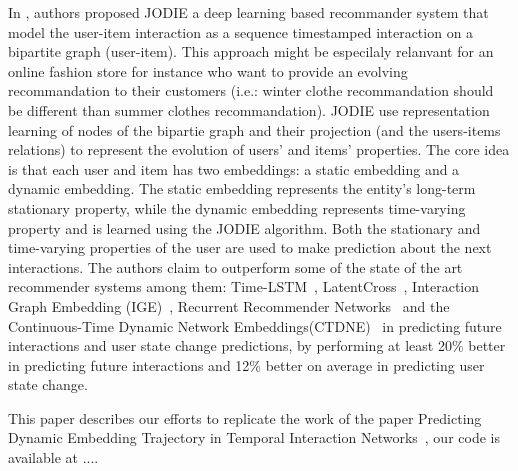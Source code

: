In \cite{kumar2019predicting}, authors proposed JODIE a deep learning based recommander system that model the user-item interaction as a sequence timestamped interaction on a bipartite graph (user-item). This approach might be especilaly relanvant for an online fashion store for instance who want to provide an evolving recommandation to their customers (i.e.: winter clothe recommandation should be different than summer clothes recommandation). JODIE use representation learning of nodes of the bipartie graph and their projection (and the users-items relations) to represent the evolution of users’ and items’ properties. The core idea is that each user and item has two embeddings: a static embedding and a dynamic embedding. The static embedding represents the entity’s long-term stationary property, while the dynamic embedding represents time-varying property and is learned using the JODIE algorithm. Both the stationary and time-varying properties of the user are used to make prediction about the next interactions. 
The authors claim to outperform some of the state of the art recommender systems among them: Time-LSTM~\cite{Zhu17}, LatentCross~\cite{Beutel18}, Interaction Graph Embedding (IGE)~\cite{Zhang17}, Recurrent Recommender Networks~\cite{Wu17} and the Continuous-Time Dynamic Network Embeddings(CTDNE)~\cite{Nguyen18} in predicting future interactions and user state change predictions, by performing at least 20\% better in predicting future interactions and 12\% better on average in predicting user state change. 

This paper describes our efforts to replicate the work of the paper Predicting Dynamic Embedding Trajectory in Temporal Interaction Networks~\cite{kumar2019predicting}, our code is available at ....

